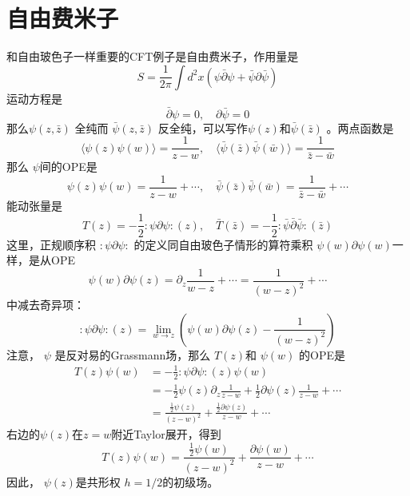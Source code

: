 \section{自由费米子}
和自由玻色子一样重要的CFT例子是自由费米子，作用量是
\begin{equation}
	S=\frac{1}{2 \pi} \int d^{2} x(\psi \bar{\partial} \psi+\bar{\psi} \partial \bar{\psi})
\end{equation}
运动方程是
\begin{equation}
	\bar{\partial} \psi=0, \quad \partial \bar{\psi}=0
\end{equation}
那么$ \psi(z,\bar{z})$ 全纯而 $\bar{\psi}(z,\bar{z})$ 反全纯，可以写作$ \psi(z) 和 \bar{\psi}(\bar{z})$ 。两点函数是
\begin{equation}
	\langle\psi(z) \psi(w)\rangle=\frac{1}{z-w}, \quad\langle\bar{\psi}(\bar{z}) \bar{\psi}(\bar{w})\rangle=\frac{1}{\bar{z}-\bar{w}}
\end{equation}
那么 $\psi $间的OPE是
\begin{equation}
	\psi(z) \psi(w)=\frac{1}{z-w}+\cdots, \quad \bar{\psi}(\bar{z}) \bar{\psi}(\bar{w})=\frac{1}{\bar{z}-\bar{w}}+\cdots
\end{equation}
能动张量是
\begin{equation}
	T(z)=-\frac{1}{2}: \psi \partial \psi:(z), \quad \bar{T}(\bar{z})=-\frac{1}{2}: \bar{\psi} \bar{\partial} \bar{\psi}:(\bar{z})
\end{equation}
这里，正规顺序积 $: \psi \partial \psi:$ 的定义同自由玻色子情形的算符乘积 $\psi(w)\partial \psi(w) $一样，是从OPE
$$
\psi(w) \partial \psi(z)=\partial_{z} \frac{1}{w-z}+\cdots=\frac{1}{(w-z)^{2}}+\cdots
$$
中减去奇异项：
\begin{equation}
		: \psi \partial \psi:(z)=\lim _{w \rightarrow z}\left(\psi(w) \partial \psi(z)-\frac{1}{(w-z)^{2}}\right)
\end{equation}
注意， $\psi$ 是反对易的Grassmann场，那么 $T(z) $和 $\psi(w)$ 的OPE是
\begin{equation}
	\begin{aligned} T(z) \psi(w) &=-\frac{1}{2}: \psi \partial \psi:(z) \psi(w) \\ &=-\frac{1}{2} \psi(z) \partial_{z} \frac{1}{z-w}+\frac{1}{2} \partial \psi(z) \frac{1}{z-w}+\cdots \\ &=\frac{\frac{1}{2} \psi(z)}{(z-w)^{2}}+\frac{\frac{1}{2} \partial \psi(z)}{z-w}+\cdots \end{aligned}
\end{equation}
右边的$\psi(z) $在$ z=w $附近Taylor展开，得到
\begin{equation}
	T(z) \psi(w)=\frac{\frac{1}{2} \psi(w)}{(z-w)^{2}}+\frac{\partial \psi(w)}{z-w}+\cdots
\end{equation}
因此， $\psi(z) $是共形权 $h=1/2 $的初级场。

